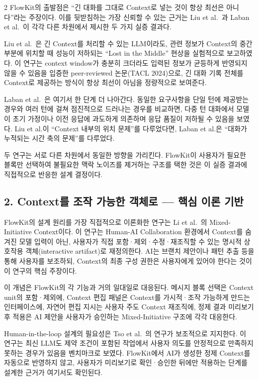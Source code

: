 \documentclass[10pt, a4paper]{article}
\begin{document}
\begin{multicols}{2}
FlowKit의 출발점은 ``긴 대화를 그대로 Context로 넣는 것이 항상 최선은 아니다''라는 주장이다. 이를 뒷받침하는 가장 신뢰할 수 있는 근거는 Liu et al.~\cite{liu2024}과 Laban et al.~\cite{laban2025}이 각각 다른 차원에서 제시한 두 가지 실증 결과다.

Liu et al.~\cite{liu2024}은 긴 Context를 처리할 수 있는 LLM이라도, 관련 정보가 Context의 중간 부분에 위치할 때 성능이 저하되는 ``Lost in the Middle'' 현상을 실험적으로 보고하였다. 이 연구는 context window가 충분히 크더라도 입력된 정보가 균등하게 반영되지 않을 수 있음을 입증한 peer-reviewed 논문(TACL 2024)으로, 긴 대화 기록 전체를 Context로 제공하는 방식이 항상 최선이 아님을 정량적으로 보여준다.

Laban et al.~\cite{laban2025}은 여기서 한 단계 더 나아간다. 동일한 요구사항을 단일 턴에 제공받는 경우와 여러 턴에 걸쳐 점진적으로 드러나는 경우를 비교하면, 다중 턴 대화에서 모델이 초기 가정이나 이전 응답에 과도하게 의존하며 응답 품질이 저하될 수 있음을 보였다. Liu et al.이 ``Context 내부의 위치 문제''를 다루었다면, Laban et al.은 ``대화가 누적되는 시간 축의 문제''를 다루었다.

두 연구는 서로 다른 차원에서 동일한 방향을 가리킨다. FlowKit이 사용자가 필요한 블록만 선택하여 불필요한 맥락 노이즈를 제거하는 구조를 택한 것은 이 실증 결과에 직접적으로 반응한 설계 결정이다.

\subsection*{2. Context를 조작 가능한 객체로 — 핵심 이론 기반}

FlowKit의 설계 원리를 가장 직접적으로 이론화한 연구는 Li et al.~\cite{li2026}의 Mixed-Initiative Context이다. 이 연구는 Human-AI Collaboration 환경에서 Context를 숨겨진 모델 입력이 아닌, 사용자가 직접 포함·제외·수정·재조직할 수 있는 명시적 상호작용 객체(interactive artifact)로 재정의한다. AI는 브랜치 제안이나 패턴 추출 등을 통해 사용자를 보조하되, Context의 최종 구성 권한은 사용자에게 있어야 한다는 것이 이 연구의 핵심 주장이다.

이 개념은 FlowKit의 각 기능과 거의 일대일로 대응된다. 메시지 블록 선택은 Context unit의 포함·제외에, Context 편집 패널은 Context를 가시적·조작 가능하게 만드는 인터페이스에, 자연어 편집 지시는 사용자 주도 Context 재조직에, 정제 결과 미리보기 후 적용은 AI 제안을 사용자가 승인하는 Mixed-Initiative 구조에 각각 대응한다.

Human-in-the-loop 설계의 필요성은 Tso et al.~\cite{tso2026}의 연구가 보조적으로 지지한다. 이 연구는 최신 LLM도 제약 조건이 포함된 작업에서 사용자 의도를 안정적으로 만족하지 못하는 경우가 있음을 벤치마크로 보였다. FlowKit에서 AI가 생성한 정제 Context를 자동으로 반영하지 않고, 사용자가 미리보기로 확인·승인한 뒤에만 적용하는 단계를 설계한 근거가 여기서도 확인된다.


\end{multicols}
\end{document}
